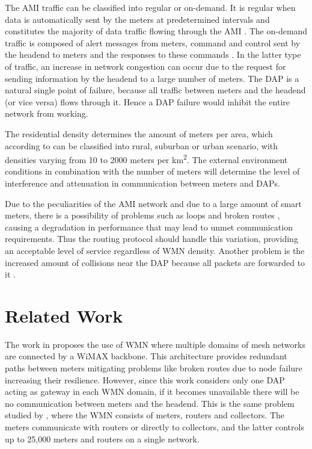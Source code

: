 \documentclass[conference]{IEEEtran}
\begin{document}
The AMI traffic can be classified into regular or on-demand. It is regular when data is automatically sent by the meters at predetermined intervals \cite{4547164,Plan2011} and constitutes the majority of data traffic flowing through the AMI \cite{5484223}. The on-demand traffic is composed of alert messages from meters, command and control sent by the headend  to meters and the responses to these commands \cite{Plan2011}. In the latter type of traffic, an increase in network congestion can occur due to the request for sending information by the headend to a large number of meters. The DAP is a natural single point of failure, because all traffic between meters and the headend (or vice versa) flows through it. Hence a DAP failure would inhibit the entire network from working.

The residential density determines the amount of meters per area, which according to \cite{Plan2011} can be classified into rural, suburban or urban scenario, with densities varying from 10 to 2000 meters per km\textsuperscript{2}. The external environment conditions in combination with the number of meters will determine the level of interference and attenuation in communication between meters and DAPs.


Due to the peculiarities of the AMI network and due to a large amount of smart meters, there is a possibility of problems such as loops and broken routes \cite{ramachandran2007routing}, causing a degradation in performance that may lead to unmet communication requirements. Thus the routing protocol should handle this variation, providing an acceptable level of service regardless of WMN density. Another problem is the increased amount of collisions near the DAP because all packets are forwarded to it \cite{Saputro2012}.




\section{Related Work}

The work in \cite{Gungor2006}  proposes the use of WMN where multiple domains of mesh networks are connected by a WiMAX backbone. This architecture provides redundant paths between meters mitigating problems like broken routes due to node failure increasing their resilience. However, since this work considers only one DAP acting as gateway in each WMN domain, if it becomes unavailable there will be no communication between meters and the headend. This is the same problem studied by \cite{5622071}, where the WMN consists of meters, routers and collectors. The meters communicate with routers or directly to collectors, and the latter controls up to 25,000 meters and routers on a single network.
\end{document}

